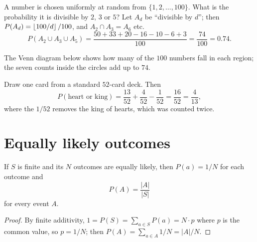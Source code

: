 \begin{example}
A number is chosen uniformly at random from $\{1,2,\dots,100\}$. What is the probability it
is divisible by $2$, $3$ or $5$? Let $A_d$ be ``divisible by $d$''; then
$P(A_d) = \left\lfloor 100/d \right\rfloor/100$, and $A_2 \cap A_3 = A_6$ etc.
\[
  P(A_2\cup A_3\cup A_5) = \frac{50 + 33 + 20 - 16 - 10 - 6 + 3}{100} = \frac{74}{100} = 0.74.
\]
\end{example}

The Venn diagram below shows how many of the $100$ numbers fall in each region; the
seven counts inside the circles add up to $74$.

\begin{center}
\end{center}

\begin{example}[Cards]
Draw one card from a standard $52$-card deck. Then
\[
  P(\text{heart or king}) = \frac{13}{52} + \frac{4}{52} - \frac{1}{52} = \frac{16}{52}
  = \frac{4}{13},
\]
where the $1/52$ removes the king of hearts, which was counted twice.
\end{example}

\section{Equally likely outcomes}

\begin{theorem}
If $S$ is finite and its $N$ outcomes are equally likely, then $P(a) = 1/N$ for each
outcome and
\[
  P(A) = \frac{|A|}{|S|}
\]
for every event $A$.
\end{theorem}

\begin{proof}
By finite additivity, $1 = P(S) = \sum_{a\in S} P(a) = N\cdot p$ where $p$ is the common
value, so $p = 1/N$; then $P(A) = \sum_{a\in A} 1/N = |A|/N$.
\end{proof}

